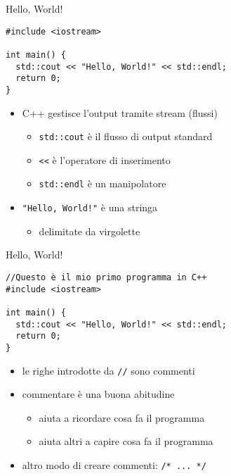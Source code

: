 \documentclass[xcolor=dvipsnames,handout]{beamer}
\begin{document}
\begin{frame}[fragile]{Hello, World!}
  \vfill
  \begin{lstlisting}
#include <iostream>

int main() {
  std::cout << "Hello, World!" << std::endl;
  return 0;
}
  \end{lstlisting}
  \vfill
  \begin{itemize}
    \item C++ gestisce l'output tramite \alert{stream} (flussi)
    \begin{itemize}
      \item \lstinline$std::cout$ è il flusso di output standard
      \item \lstinline$<<$ è l'operatore di \alert{inserimento}
      \item \lstinline$std::endl$ è un \alert{manipolatore}
    \end{itemize}
    \vfill
    \item \lstinline$"Hello, World!"$ è una \alert{stringa}
    \begin{itemize}
      \item delimitate da \alert{virgolette}
    \end{itemize}
  \end{itemize}
  \vfill
\end{frame}

\begin{frame}[fragile]{Hello, World!}
  \vfill
  \begin{lstlisting}
//Questo è il mio primo programma in C++
#include <iostream>

int main() {
  std::cout << "Hello, World!" << std::endl;
  return 0;
}
  \end{lstlisting}
  \vfill
  \begin{itemize}
    \item le righe introdotte da \lstinline$//$ sono \alert{commenti}
    \vfill
    \item commentare è una buona abitudine
    \begin{itemize}
      \item aiuta a ricordare cosa fa il programma
      \item aiuta altri a capire cosa fa il programma
    \end{itemize}
    \vfill
    \item altro modo di creare commenti: \lstinline$/* ... */$
  \end{itemize}
  \vfill
\end{frame}
\end{document}
